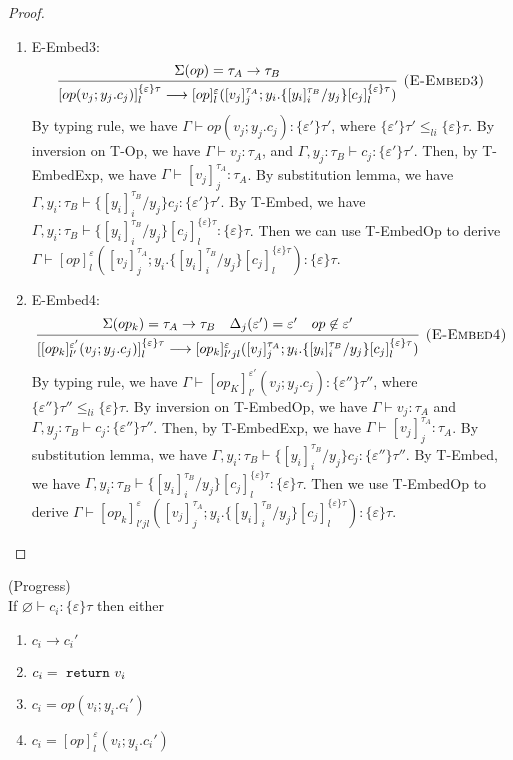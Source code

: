 \begin{lemma}
\begin{proof}
\begin{enumerate}
\item E-Embed3: 
$$
\infer[\textsc{(E-Embed3)}]
{[op(v_j; y_j.c_j)]^{\{\varepsilon\}\tau}_l \longrightarrow [op]^\varepsilon_l([v_j]^{\tau_A}_j; y_i. \{[y_i]^{\tau_B}_i / y_j\}[c_j]^{\{\varepsilon\}\tau}_l)}
{ \Sigma(op) = \tau_A \rightarrow \tau_B} 
$$
By typing rule, we have $\Gamma \vdash op(v_j; y_j.c_j) : \{\varepsilon'\}\tau'$, where $\{\varepsilon'\}\tau' \leq_{li} \{\varepsilon\}\tau$. By inversion on T-Op, we have $\Gamma \vdash v_j : \tau_A$, and $\Gamma, y_j : \tau_B \vdash c_j: \{\varepsilon'\}\tau'$. Then, by T-EmbedExp, we have $\Gamma \vdash [v_j]^{\tau_A}_j : \tau_A$. By substitution lemma, we have $\Gamma, y_i: \tau_B \vdash \{[y_i]^{\tau_B}_i/y_j\}c_j : \{\varepsilon'\}\tau'$. By T-Embed, we have $\Gamma, y_i: \tau_B \vdash \{[y_i]^{\tau_B}_i/y_j\}[c_j]^{\{\varepsilon\}\tau}_l : \{\varepsilon\}\tau$. Then we can use T-EmbedOp to derive $\Gamma \vdash [op]^\varepsilon_l([v_j]^{\tau_A}_j; y_i. \{[y_i]^{\tau_B}_i / y_j\}[c_j]^{\{\varepsilon\}\tau}_l): \{\varepsilon\}\tau$. 

\item E-Embed4:
$$
\infer[\textsc{(E-Embed4)}]
{[[op_k]^{\varepsilon'}_{l'}(v_j; y_j.c_j)]^{\{\varepsilon\}\tau}_l \longrightarrow [op_k]^\varepsilon_{l'jl}([v_j]^{\tau_A}_j; y_i. \{[y_i]^{\tau_B}_i / y_j\}[c_j]^{\{\varepsilon\}\tau}_l)}
{ \Sigma(op_k) = \tau_A \rightarrow \tau_B& \Delta_j(\varepsilon') = \varepsilon' & op \not \in \varepsilon'} 
$$
By typing rule, we have $\Gamma \vdash [op_K]^{\varepsilon'}_{l'}(v_j; y_j.c_j) : \{\varepsilon''\}\tau''$, where $\{\varepsilon''\}\tau'' \leq_{li} \{\varepsilon\}\tau$. By inversion on T-EmbedOp, we have $\Gamma \vdash v_j: \tau_A$ and $\Gamma, y_j : \tau_B \vdash c_j: \{\varepsilon''\}\tau''$. Then, by T-EmbedExp, we have $\Gamma \vdash [v_j]^{\tau_A}_j : \tau_A$.
By substitution lemma, we have $\Gamma, y_i: \tau_B \vdash \{[y_i]^{\tau_B}_i/y_j\}c_j : \{\varepsilon''\}\tau''$. By T-Embed, we have $\Gamma, y_i: \tau_B \vdash \{[y_i]^{\tau_B}_i/y_j\}[c_j]^{\{\varepsilon\}\tau}_l : \{\varepsilon\}\tau$. Then we use T-EmbedOp to derive $\Gamma \vdash [op_k]^\varepsilon_{l'jl}([v_j]^{\tau_A}_j; y_i. \{[y_i]^{\tau_B}_i / y_j\}[c_j]^{\{\varepsilon\}\tau}_l) : \{\varepsilon\}\tau$.
\end{enumerate}
\end{proof}
\end{lemma}

\begin{lemma} (Progress) \\
If $\varnothing \vdash c_i : \{\varepsilon\} \tau$ then either
\begin{enumerate}
\item  $c_i \longrightarrow c_i'$ 
\item  $c_i = \ \texttt{return}\  v_i$
\item $c_i = op(v_i; y_i.c_i')$
\item $c_i = [op]^\varepsilon_l(v_i; y_i.c_i')$
 \end{enumerate}
\end{lemma}







